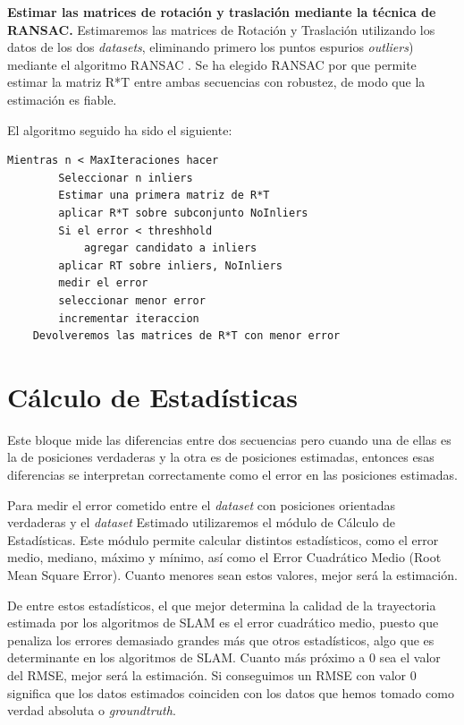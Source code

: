 \textbf{Estimar las matrices de rotación y traslación mediante la técnica de RANSAC.}
Estimaremos las matrices de Rotación y Traslación utilizando los datos de los dos \textit{datasets}, eliminando primero los puntos espurios \textit{outliers}) mediante el algoritmo RANSAC \cite{Fischler:1981:RSC:358669.358692}.
Se ha elegido RANSAC por que permite estimar la matriz R*T entre ambas secuencias con robustez, de modo que la estimación es fiable.



El algoritmo seguido ha sido el siguiente:
    \begin{lstlisting}[frame=single]
	Mientras n < MaxIteraciones hacer
		Seleccionar n inliers
		Estimar una primera matriz de R*T
		aplicar R*T sobre subconjunto NoInliers
		Si el error < threshhold
			agregar candidato a inliers
		aplicar RT sobre inliers, NoInliers
		medir el error 
		seleccionar menor error
		incrementar iteraccion
	Devolveremos las matrices de R*T con menor error
	\end{lstlisting}
	        
   

\section{Cálculo de Estadísticas}

Este bloque mide las diferencias entre dos secuencias pero cuando una de ellas es la de posiciones verdaderas y la otra es de posiciones estimadas, entonces esas diferencias se interpretan correctamente como el error en las posiciones estimadas.

Para medir el error cometido entre el \textit{dataset} con posiciones orientadas verdaderas y el \textit{dataset} Estimado utilizaremos el módulo de Cálculo de Estadísticas.
Este módulo permite calcular distintos estadísticos, como el error medio, mediano, máximo y mínimo, así como el Error Cuadrático Medio (Root Mean Square Error).
Cuanto menores sean estos valores, mejor será la estimación.

De entre estos estadísticos, el que mejor determina la calidad de la trayectoria estimada por los algoritmos de SLAM es el error cuadrático medio, puesto que penaliza los errores demasiado grandes más que otros estadísticos, algo que es determinante en los algoritmos de SLAM. Cuanto más próximo a 0 sea el valor del RMSE, mejor será la estimación. Si conseguimos un RMSE con valor 0 significa que los datos estimados coinciden con los datos que hemos tomado como verdad absoluta o \textit{groundtruth}.

